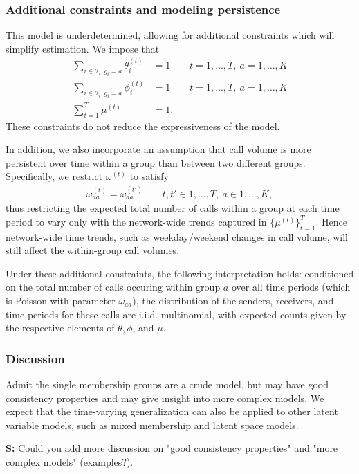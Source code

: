 \documentclass{article}
\begin{document}
\subsubsection{Additional constraints and modeling persistence}

This model is underdetermined, allowing for additional constraints which will simplify estimation. We impose that
\begin{align*}
\sum_{i \in \mathcal{I}_t, g_i=a} \theta_i^{(t)} & = 1 \qquad t=1,\ldots,T,\ a=1,\ldots,K\\
\sum_{i \in \mathcal{I}_t, g_i=a} \phi_i^{(t)} & = 1 \qquad t=1,\ldots,T,\ a=1,\ldots,K\\
\sum_{t=1}^T \mu^{(t)} & = 1.
\end{align*}
These constraints do not reduce the expressiveness of the model.

In addition, we also incorporate an assumption that call volume is more persistent over time within a group than between two different groups. Specifically, we restrict $\omega^{(t)}$ to satisfy
\begin{align} \label{eq:constraint}
\omega_{aa}^{(t)} = \omega_{aa}^{(t')} \qquad t,t' \in 1,\ldots,T, \ a\in 1,\ldots,K,
\end{align}
thus restricting the expected total number of calls within a group at each time period to vary only with the network-wide trends captured in $\{\mu^{(t)}\}_{t=1}^T$. Hence network-wide time trends, such as weekday/weekend changes in call volume, will still affect the within-group call volumes.

Under these additional constraints, the following interpretation holds: conditioned on the total number of calls occuring within group $a$ over all time periods (which is Poisson with parameter $\omega_{aa}$), the distribution of the senders, receivers, and time periods for these calls are i.i.d. multinomial, with expected counts given by the respective elements of $\theta, \phi$, and $\mu$.


\subsubsection{Discussion}
Admit the single membership groups are a crude model, but may have good consistency properties and may give insight into more complex models. We expect that the time-varying generalization can also be applied to other latent variable models, such as mixed membership  and latent space models.

\textbf{S:} Could you add more discussion on "good consistency properties" and "more complex models" (examples?).
\end{document}
